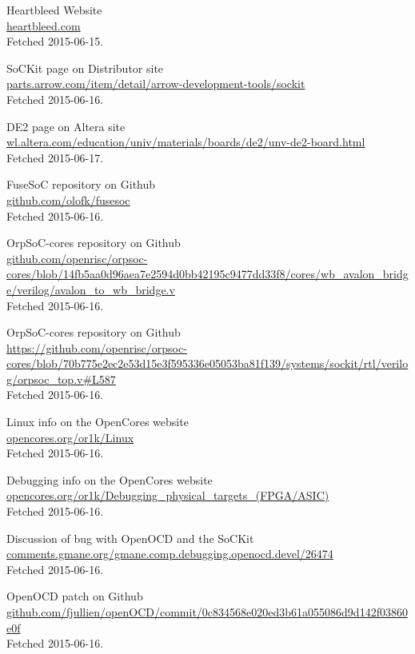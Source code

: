 \documentclass[11pt,a4paper,twoside,openany]{report}
\begin{document}
\begin{thebibliography}{99}

  Heartbleed Website\\
  \url{heartbleed.com}\\
  Fetched 2015-06-15.
  
  SoCKit page on Distributor site\\
  \url{parts.arrow.com/item/detail/arrow-development-tools/sockit}\\
  Fetched 2015-06-16.

	DE2 page on Altera site\\
  \url{wl.altera.com/education/univ/materials/boards/de2/unv-de2-board.html}\\
  Fetched 2015-06-17.
  
  FuseSoC repository on Github\\
  \url{github.com/olofk/fusesoc}\\
  Fetched 2015-06-16.
  
	OrpSoC-cores repository on Github\\
	\url{github.com/openrisc/orpsoc-cores/blob/14fb5aa0d96aea7e2594d0bb42195c9477dd33f8/cores/wb_avalon_bridge/verilog/avalon_to_wb_bridge.v} \\
	Fetched 2015-06-16.
	  
	OrpSoC-cores repository on Github\\
	\url{https://github.com/openrisc/orpsoc-cores/blob/70b775e2ec2e53d15e3f595336e05053ba81f139/systems/sockit/rtl/verilog/orpsoc_top.v#L587} \\
	Fetched 2015-06-16.
	
	Linux info on the OpenCores website\\
	\url{opencores.org/or1k/Linux}\\
	Fetched 2015-06-16.
	
	Debugging info on the OpenCores website\\
	\url{opencores.org/or1k/Debugging_physical_targets_(FPGA/ASIC)}\\
	Fetched 2015-06-16.
	
	Discussion of bug with OpenOCD and the SoCKit\\
	\url{comments.gmane.org/gmane.comp.debugging.openocd.devel/26474}\\
	Fetched 2015-06-16.
	
	OpenOCD patch on Github\\
	\url{github.com/fjullien/openOCD/commit/0c834568e020ed3b61a055086d9d142f03860e0f}\\
	Fetched 2015-06-16.


\end{thebibliography}
\end{document}

